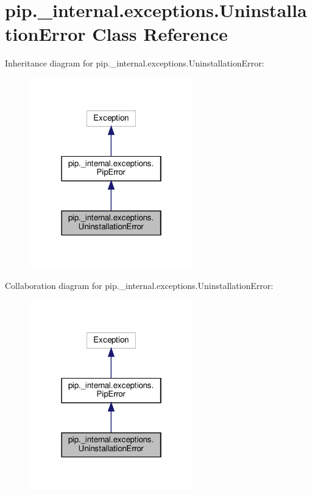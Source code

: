\hypertarget{classpip_1_1__internal_1_1exceptions_1_1UninstallationError}{}\section{pip.\+\_\+internal.\+exceptions.\+Uninstallation\+Error Class Reference}
\label{classpip_1_1__internal_1_1exceptions_1_1UninstallationError}


Inheritance diagram for pip.\+\_\+internal.\+exceptions.\+Uninstallation\+Error\+:
\nopagebreak
\begin{figure}[H]
\begin{center}
\leavevmode
\includegraphics[width=202pt]{classpip_1_1__internal_1_1exceptions_1_1UninstallationError__inherit__graph}
\end{center}
\end{figure}


Collaboration diagram for pip.\+\_\+internal.\+exceptions.\+Uninstallation\+Error\+:
\nopagebreak
\begin{figure}[H]
\begin{center}
\leavevmode
\includegraphics[width=202pt]{classpip_1_1__internal_1_1exceptions_1_1UninstallationError__coll__graph}
\end{center}
\end{figure}



